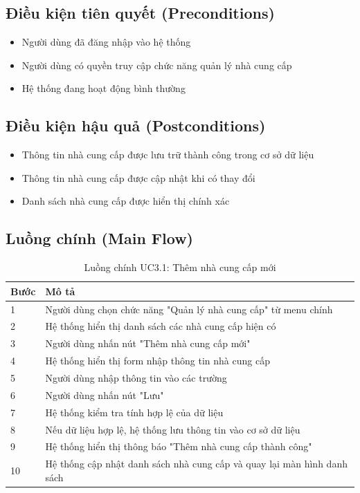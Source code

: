 \documentclass[a4paper,12pt]{article}
\begin{document}
\subsection{Điều kiện tiên quyết (Preconditions)}
\begin{itemize}
    \item Người dùng đã đăng nhập vào hệ thống
    \item Người dùng có quyền truy cập chức năng quản lý nhà cung cấp
    \item Hệ thống đang hoạt động bình thường
\end{itemize}

\subsection{Điều kiện hậu quả (Postconditions)}
\begin{itemize}
    \item Thông tin nhà cung cấp được lưu trữ thành công trong cơ sở dữ liệu
    \item Thông tin nhà cung cấp được cập nhật khi có thay đổi
    \item Danh sách nhà cung cấp được hiển thị chính xác
\end{itemize}

\subsection{Luồng chính (Main Flow)}

\begin{table}[h]
\centering
\renewcommand{\arraystretch}{0.85}
\begin{tabular}{|p{1.5cm}|p{10cm}|}
\hline
\textbf{Bước} & \textbf{Mô tả} \\
\hline
1 & Người dùng chọn chức năng "Quản lý nhà cung cấp" từ menu chính \\
\hline
2 & Hệ thống hiển thị danh sách các nhà cung cấp hiện có \\
\hline
3 & Người dùng nhấn nút "Thêm nhà cung cấp mới" \\
\hline
4 & Hệ thống hiển thị form nhập thông tin nhà cung cấp \\
\hline
5 & Người dùng nhập thông tin vào các trường \\
\hline
6 & Người dùng nhấn nút "Lưu" \\
\hline
7 & Hệ thống kiểm tra tính hợp lệ của dữ liệu \\
\hline
8 & Nếu dữ liệu hợp lệ, hệ thống lưu thông tin vào cơ sở dữ liệu \\
\hline
9 & Hệ thống hiển thị thông báo "Thêm nhà cung cấp thành công" \\
\hline
10 & Hệ thống cập nhật danh sách nhà cung cấp và quay lại màn hình danh sách \\
\hline
\end{tabular}
\caption{Luồng chính UC3.1: Thêm nhà cung cấp mới}
\end{table}
\end{document}
